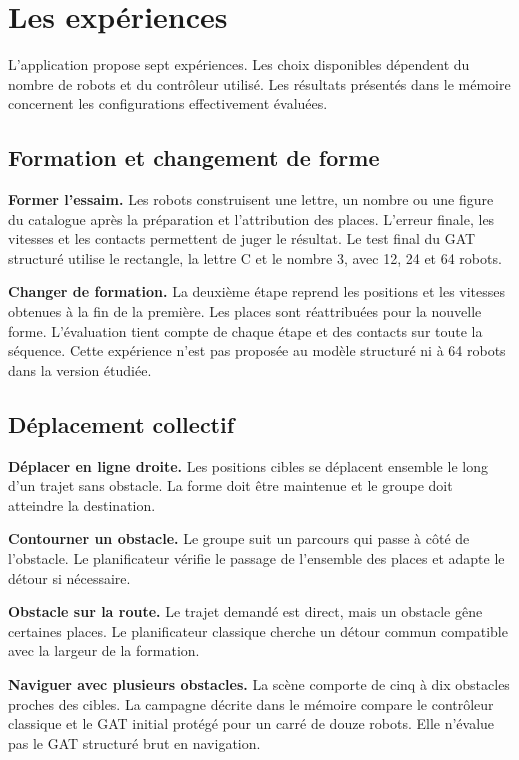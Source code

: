 \chapter*{Les expériences}
\label{ann:experiences}
L'application propose sept expériences. Les choix disponibles dépendent du nombre de robots et du contrôleur utilisé. Les résultats présentés dans le mémoire concernent les configurations effectivement évaluées.

\section*{Formation et changement de forme}
\textbf{Former l'essaim.} Les robots construisent une lettre, un nombre ou une figure du catalogue après la préparation et l'attribution des places. L'erreur finale, les vitesses et les contacts permettent de juger le résultat. Le test final du GAT structuré utilise le rectangle, la lettre C et le nombre 3, avec 12, 24 et 64 robots.

\textbf{Changer de formation.} La deuxième étape reprend les positions et les vitesses obtenues à la fin de la première. Les places sont réattribuées pour la nouvelle forme. L'évaluation tient compte de chaque étape et des contacts sur toute la séquence. Cette expérience n'est pas proposée au modèle structuré ni à 64 robots dans la version étudiée.

\section*{Déplacement collectif}
\textbf{Déplacer en ligne droite.} Les positions cibles se déplacent ensemble le long d'un trajet sans obstacle. La forme doit être maintenue et le groupe doit atteindre la destination.

\textbf{Contourner un obstacle.} Le groupe suit un parcours qui passe à côté de l'obstacle. Le planificateur vérifie le passage de l'ensemble des places et adapte le détour si nécessaire.

\textbf{Obstacle sur la route.} Le trajet demandé est direct, mais un obstacle gêne certaines places. Le planificateur classique cherche un détour commun compatible avec la largeur de la formation.

\textbf{Naviguer avec plusieurs obstacles.} La scène comporte de cinq à dix obstacles proches des cibles. La campagne décrite dans le mémoire compare le contrôleur classique et le GAT initial protégé pour un carré de douze robots. Elle n'évalue pas le GAT structuré brut en navigation.

